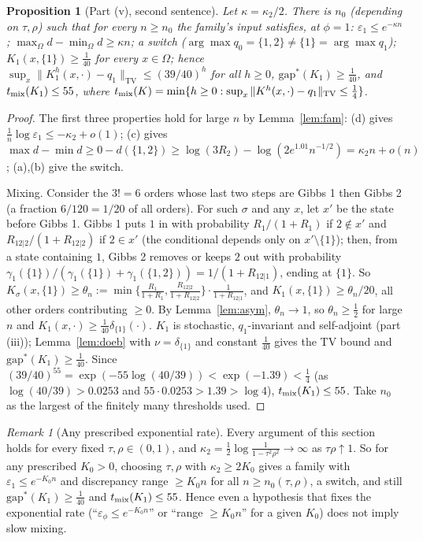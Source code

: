 \documentclass[11pt]{article}
\newtheorem{proposition}[theorem]{Proposition}
\theoremstyle{remark}
\newtheorem{remark}[theorem]{Remark}
\newcommand{\Om}{\Omega}
\newcommand{\eps}{\varepsilon}
\newcommand{\gs}{\mathrm{gap}^*}
\newcommand{\TV}{\mathrm{TV}}
\begin{document}
\begin{proposition}[Part (v), second sentence]\label{prop:v}
Let $\kappa=\kappa_2/2$. There is $n_0$ (depending on $\tau,\rho$) such that for every $n\ge n_0$ the family's input satisfies, at $\phi=1$: $\eps_1\le e^{-\kappa n}$; $\max_\Om d-\min_\Om d\ge\kappa n$; a switch ($\arg\max q_0=\{1,2\}\neq\{1\}=\arg\max q_1$); $K_1(x,\{1\})\ge\frac1{40}$ for every $x\in\Om$; hence $\sup_x\|K_1^h(x,\cdot)-q_1\|_\TV\le(39/40)^h$ for all $h\ge0$, $\gs(K_1)\ge\frac1{40}$, and $t_{\rm mix}(K_1)\le55$, where $t_{\rm mix}(K)=\min\{h\ge0:\sup_x\|K^h(x,\cdot)-q_1\|_\TV\le\frac14\}$.
\end{proposition}
\begin{proof}
The first three properties hold for large $n$ by Lemma~\ref{lem:fam}: (d) gives $\frac1n\log\eps_1\le-\kappa_2+o(1)$; (c) gives $\max d-\min d\ge0-d(\{1,2\})\ge\log(3R_2)-\log(2e^{1.01}n^{-1/2})=\kappa_2n+o(n)$; (a),(b) give the switch.

Mixing. Consider the $3!=6$ orders whose last two steps are Gibbs 1 then Gibbs 2 (a fraction $6/120=1/20$ of all orders). For such $\sigma$ and any $x$, let $x'$ be the state before Gibbs 1. Gibbs 1 puts $1$ in with probability $R_1/(1+R_1)$ if $2\notin x'$ and $R_{12|2}/(1+R_{12|2})$ if $2\in x'$ (the conditional depends only on $x'\setminus\{1\}$); then, from a state containing $1$, Gibbs 2 removes or keeps $2$ out with probability $\gamma_1(\{1\})/(\gamma_1(\{1\})+\gamma_1(\{1,2\}))=1/(1+R_{12|1})$, ending at $\{1\}$. So $K_\sigma(x,\{1\})\ge\theta_n:=\min\{\frac{R_1}{1+R_1},\frac{R_{12|2}}{1+R_{12|2}}\}\cdot\frac1{1+R_{12|1}}$, and $K_1(x,\{1\})\ge\theta_n/20$, all other orders contributing $\ge0$. By Lemma~\ref{lem:asym}, $\theta_n\to1$, so $\theta_n\ge\frac12$ for large $n$ and $K_1(x,\cdot)\ge\frac1{40}\delta_{\{1\}}(\cdot)$. $K_1$ is stochastic, $q_1$-invariant and self-adjoint (part (iii)); Lemma~\ref{lem:doeb} with $\nu=\delta_{\{1\}}$ and constant $\frac1{40}$ gives the TV bound and $\gs(K_1)\ge\frac1{40}$. Since $(39/40)^{55}=\exp(-55\log(40/39))<\exp(-1.39)<\frac14$ (as $\log(40/39)>0.0253$ and $55\cdot0.0253>1.39>\log4$), $t_{\rm mix}(K_1)\le55$. Take $n_0$ as the largest of the finitely many thresholds used.
\end{proof}

\begin{remark}[Any prescribed exponential rate]\label{rem:rate}
Every argument of this section holds for every fixed $\tau,\rho\in(0,1)$, and $\kappa_2=\frac12\log\frac1{1-\tau^2\rho^2}\to\infty$ as $\tau\rho\uparrow1$. So for any prescribed $K_0>0$, choosing $\tau,\rho$ with $\kappa_2\ge2K_0$ gives a family with $\eps_1\le e^{-K_0n}$ and discrepancy range $\ge K_0n$ for all $n\ge n_0(\tau,\rho)$, a switch, and still $\gs(K_1)\ge\frac1{40}$ and $t_{\rm mix}(K_1)\le55$. Hence even a hypothesis that fixes the exponential rate (``$\eps_\phi\le e^{-K_0n}$'' or ``range $\ge K_0n$'' for a given $K_0$) does not imply slow mixing.
\end{remark}
\end{document}
